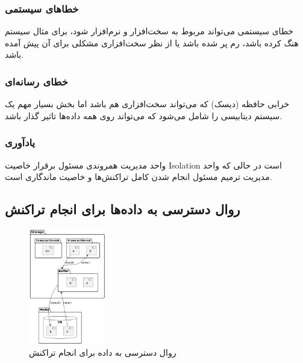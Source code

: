 \documentclass[a4paper]{article}
\begin{document}
\subsubsection{خطا‌های سیستمی}

خطای سیستمی می‌تواند مربوط به سخت‌افزار و نرم‌افزار شود، برای مثال سیستم هنگ
کرده باشد، رم پر شده باشد یا از نظر سخت‌افزاری مشکلی برای آن پیش آمده باشد.

\subsubsection{خطای رسانه‌ای}

خرابی حافظه (دیسک) که می‌تواند سخت‌افزاری هم باشد اما بخش بسیار مهم یک سیستم
دیتابیسی را شامل می‌شود که می‌تواند روی همه داده‌ها تاثیر گذار باشد.

\subsubsection*{یادآوری}

واحد مدیریت همروندی مسئول برقرار خاصیت Isolation است در حالی که واحد مدیریت
ترمیم مسئول انجام شدن کامل تراکنش‌ها و خاصیت ماندگاری است.

\subsection{روال دسترسی به داده‌ها برای انجام تراکنش}





\begin{figure}
    \centering
    \includegraphics[width=0.3\textwidth]{umls/media.png}
    \caption{روال دسترسی به داده برای انجام تراکنش}
    \label{fig:media}
\end{figure}
\end{document}
